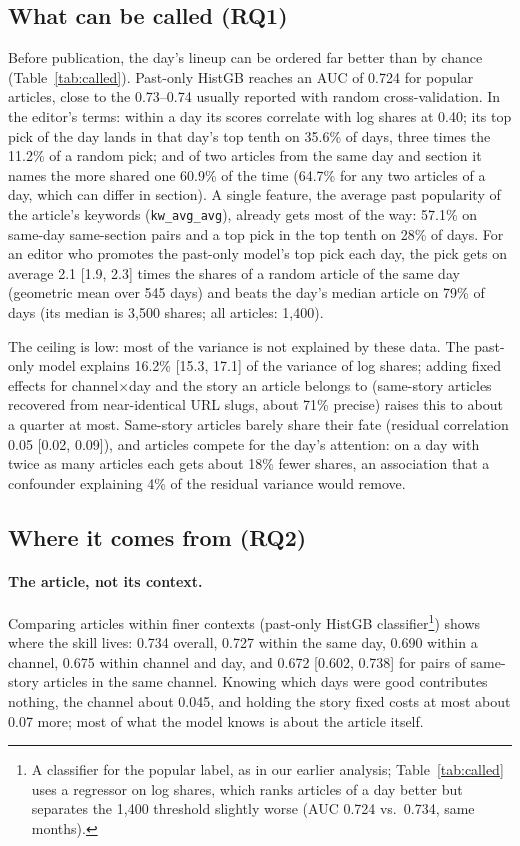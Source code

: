 \documentclass[10pt,a4paper,twocolumn]{article}
\begin{document}
\subsection{What can be called (RQ1)}
\label{sec:rq1}
Before publication, the day's lineup can be ordered far better than by chance (Table~\ref{tab:called}). Past-only
HistGB reaches an AUC of 0.724 for popular articles, close to the 0.73--0.74 usually reported with random
cross-validation. In the editor's terms: within a day its scores correlate with log shares at 0.40; its top
pick of the day lands in that day's top tenth on 35.6\% of days, three times the 11.2\% of a random pick; and of
two articles from the same day and section it names the more shared one 60.9\% of the time (64.7\% for any two
articles of a day, which can differ in section). A single feature, the average past popularity of the article's
keywords (\texttt{kw\_avg\_avg}), already gets most of the way: 57.1\% on same-day same-section pairs and a top
pick in the top tenth on 28\% of days. For an editor who promotes the past-only model's top pick each day, the pick gets
on average 2.1 [1.9, 2.3] times the shares of a random article of the same day (geometric mean over 545 days)
and beats the day's median article on 79\% of days (its median is 3{,}500 shares; all articles: 1{,}400).

The ceiling is low: most of the variance is not explained by these data. The past-only model explains 16.2\% [15.3, 17.1]
of the variance of log shares; adding fixed effects for channel$\times$day and the story an article belongs to
(same-story articles recovered from near-identical URL slugs, about 71\% precise) raises this to about a quarter
at most. Same-story articles barely share their fate (residual correlation 0.05 [0.02, 0.09]), and articles
compete for the day's attention: on a day with twice as many articles each gets about 18\% fewer shares, an
association that a confounder explaining 4\% of the residual variance would remove.

\subsection{Where it comes from (RQ2)}
\label{sec:rq2}
\paragraph{The article, not its context.} Comparing articles within finer contexts (past-only HistGB
classifier\footnote{A classifier for the popular label, as in our earlier analysis; Table~\ref{tab:called} uses a
regressor on log shares, which ranks articles of a day better but separates the 1{,}400 threshold slightly worse
(AUC 0.724 vs.\ 0.734, same months).}) shows where the skill lives: 0.734 overall, 0.727 within the same day, 0.690 within a channel,
0.675 within channel and day, and 0.672 [0.602, 0.738] for pairs of same-story articles in the same channel.
Knowing which days were good contributes nothing, the channel about 0.045, and holding the story fixed costs at
most about 0.07 more; most of what the model knows is about the article itself.
\end{document}
